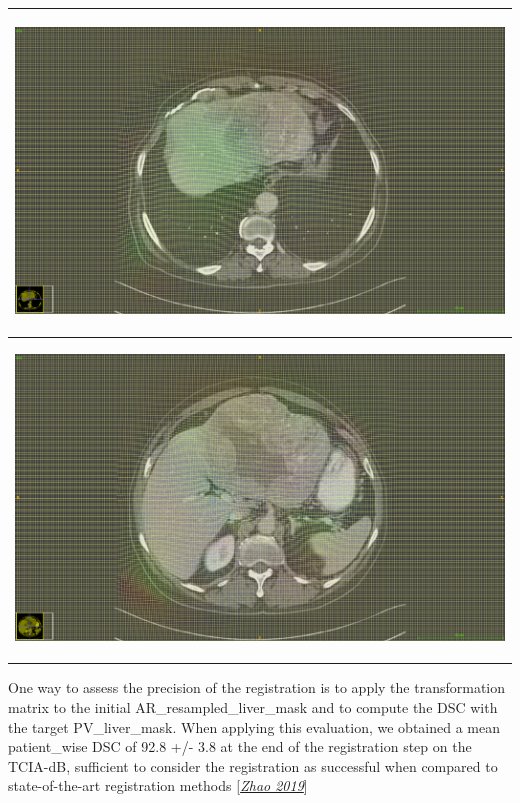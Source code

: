 \documentclass[]{article}
\begin{document}
\begin{longtable}[c]{@{}l@{}}
\toprule
\includegraphics[width=5.61458in,height=3.29167in]{./images/media/image15.png}\tabularnewline
\midrule
\endhead
\includegraphics[width=5.61458in,height=3.29167in]{./images/media/image17.png}\tabularnewline
\bottomrule
\end{longtable}

One way to assess the precision of the registration is to apply the
transformation matrix to the initial AR\_resampled\_liver\_mask and to
compute the DSC with the target PV\_liver\_mask. When applying this
evaluation, we obtained a mean patient\_wise DSC of 92.8 +/- 3.8 at the
end of the registration step on the TCIA-dB, sufficient to consider the
registration as successful when compared to state-of-the-art
registration methods
{[}\href{https://openaccess.thecvf.com/content_ICCV_2019/papers/Zhao_Recursive_Cascaded_Networks_for_Unsupervised_Medical_Image_Registration_ICCV_2019_paper.pdf}{\emph{Zhao
2019}}{]}
\end{document}
